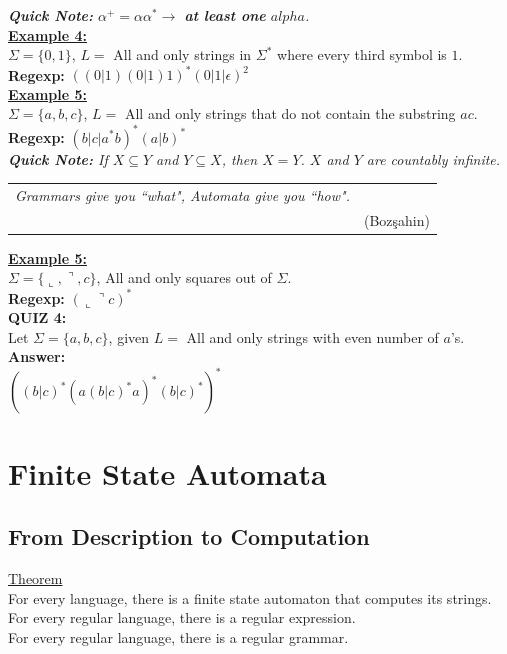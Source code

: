 \documentclass[12pt,a4paper]{article}
\begin{document}
{\textit{\textbf{Quick Note:} $\alpha^{+}=\alpha\alpha^{*}\longrightarrow$ \textbf{at least one} $alpha$.}\\

\noindent \underline{\textbf{Example 4:}}\\
$\Sigma=\lbrace 0,1\rbrace$, $L=$ All and only strings in $\Sigma^{*}$ where every third symbol is $1$.\\
\textbf{Regexp:} $((0|1)(0|1)1)^{*}(0|1|\epsilon)^{2}$\\

\noindent \underline{\textbf{Example 5:}}\\
$\Sigma=\lbrace a,b,c\rbrace$, $L=$ All and only strings that do not contain the substring $ac$.\\
\textbf{Regexp:} $(b|c|a^{*}b)^{*}(a|b)^{*}$\\

\textit{\textbf{Quick Note:} If $X\subseteq Y$ and $Y\subseteq X$, then $X=Y$. \emph{$X$ and $Y$ are countably infinite.}}

\begin{table}[H]
\centering
\begin{tabular}{cc}
\hline 
\emph{Grammars give you ``what", Automata give you ``how".} &\\ 
& (Bozşahin) \\ 
\hline 
\end{tabular} 
\end{table}

\noindent \underline{\textbf{Example 5:}}\\
$\Sigma = \lbrace \llcorner , \urcorner , c \rbrace$, All and only squares out of $\Sigma$.\\
\textbf{Regexp:} $(\llcorner \urcorner c)^{*}$\\

\noindent \textbf{\Large{QUIZ 4:}}\\
Let $\Sigma=\lbrace a,b,c\rbrace$, given $L=$ All and only strings with even number of $a$'s.\\

\noindent \textbf{\Large{Answer:}}\\
$((b|c)^{*}(a(b|c)^{*}a)^{*}(b|c)^{*})^{*}$
\clearpage

\section{Finite State Automata}
\subsection{From Description to Computation}
\underline{Theorem}\\
For every language, there is a finite state automaton that computes its strings.\\
For every regular language, there is a regular expression.\\
For every regular language, there is a regular grammar.\\

}
\end{document}
